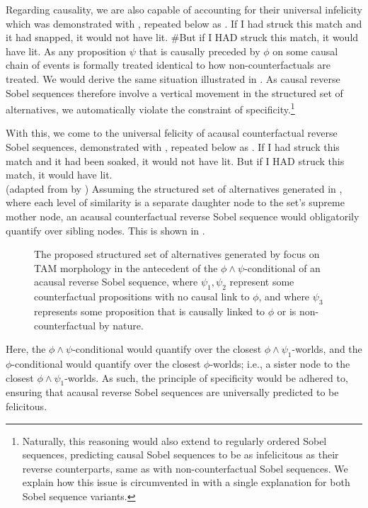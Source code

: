 Regarding causality, we are also capable of accounting for their universal infelicity which was demonstrated with , repeated below as .
\ex{}If I had struck this match and it had snapped, it would not have lit. \#But if I \MakeUppercase{had} struck this match, it would have lit.
\xe
As any proposition $\psi$ that is causally preceded by $\phi$ on some causal chain of events is formally treated identical to how non-counterfactuals are treated. We would derive the same situation illustrated in . As causal reverse Sobel sequences therefore involve a vertical movement in the structured set of alternatives, we automatically violate the constraint of specificity.\footnote{Naturally, this reasoning would also extend to regularly ordered Sobel sequences, predicting causal Sobel sequences to be as infelicitous as their reverse counterparts, same as with non-counterfactual Sobel sequences. We explain how this issue is circumvented in  with a single explanation for both Sobel sequence variants.} 

With this, we come to the universal felicity of acausal counterfactual reverse Sobel sequences, demonstrated with , repeated below as .
\ex{}If I had struck this match and it had been soaked, it would not have lit. But if I \MakeUppercase{had} struck this match, it would have lit.\\%
\emptyfill(adapted from \textcite[p. 106]{Stalnaker1968} by \textcite[p. 487]{Lewis2018})
\xe
Assuming the structured set of alternatives generated in , where each level of similarity is a separate daughter node to the set's supreme mother node, an acausal counterfactual reverse Sobel sequence would obligatorily quantify over sibling nodes. This is shown in .
\begin{figure}[!htb]
    \centering
    \resizebox{\textwidth}{!}{}
    \caption{The proposed structured set of alternatives generated by focus on TAM morphology in the antecedent of the $\phi\land\psi$-conditional of an acausal reverse Sobel sequence, where $\psi_1,\psi_2$ represent some counterfactual propositions with no causal link to $\phi$, and where $\psi_3$ represents some proposition that is causally linked to $\phi$ or is non-counterfactual by nature.}
\end{figure}
Here, the $\phi\land\psi$-conditional would quantify over the closest $\phi\land\psi_1$-worlds, and the $\phi$-conditional would quantify over the closest $\phi$-worlds; i.e., a sister node to the closest $\phi\land\psi_1$-worlds. As such, the principle of specificity would be adhered to, ensuring that acausal reverse Sobel sequences are universally predicted to be felicitous.

